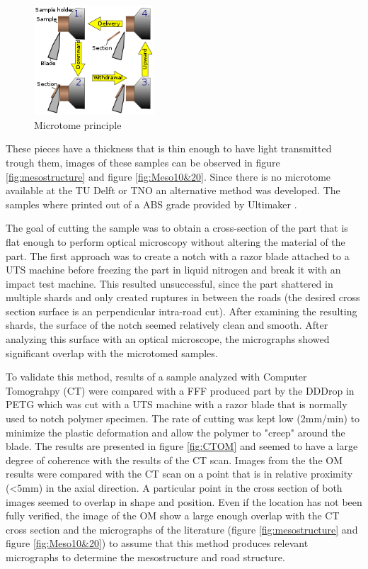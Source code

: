 \begin{figure}[H]
    \centering
    \includegraphics[width=0.40\textwidth]{chapter_4_RVE_Definition/figures/Microtomeprinciple.png}
    \caption{Microtome principle}
    \label{fig:Microtomeprinciple}
\end{figure}

These pieces have a thickness that is thin enough to have light transmitted trough them, images of these samples can be observed in figure \ref{fig:mesostructure} and figure \ref{fig:Meso10&20}. Since there is no microtome available at the TU Delft or TNO an alternative method was developed. The samples where printed out of a ABS grade provided by Ultimaker \cite{Ultimaker2018TechnicalABS}. 

The goal of cutting the sample was to obtain a cross-section of the part that is flat enough to perform optical microscopy without altering the material of the part. The first approach was to create a notch with a razor blade attached to a UTS machine before freezing the part in liquid nitrogen and break it with an impact test machine. This resulted unsuccessful, since the part shattered in multiple shards and only created ruptures in between the roads (the desired cross section surface is an perpendicular intra-road cut). After examining the resulting shards, the surface of the notch seemed relatively clean and smooth. After analyzing this surface with an optical microscope, the micrographs showed significant overlap with the microtomed samples. 

To validate this method, results of a sample analyzed with Computer Tomograhpy (CT) were compared with a FFF produced part by the DDDrop \cite{Veen2019EnhancingTemperature} in PETG which was cut with a UTS machine with a razor blade that is normally used to notch polymer specimen. The rate of cutting was kept low (2mm/min) to minimize the plastic deformation and allow the polymer to "creep" around the blade. The results are presented in figure \ref{fig:CTOM} and seemed to have a large degree of coherence with the results of the CT scan. Images from the the OM results were compared with the CT scan on a point that is in relative proximity (<5mm) in the axial direction. A particular point in the cross section of both images seemed to overlap in shape and position. Even if the location has not been fully verified, the image of the OM show a large enough overlap with the CT cross section and the micrographs of the literature (figure \ref{fig:mesostructure} and figure \ref{fig:Meso10&20}) to assume that this method produces relevant micrographs to determine the mesostructure and road structure.  

